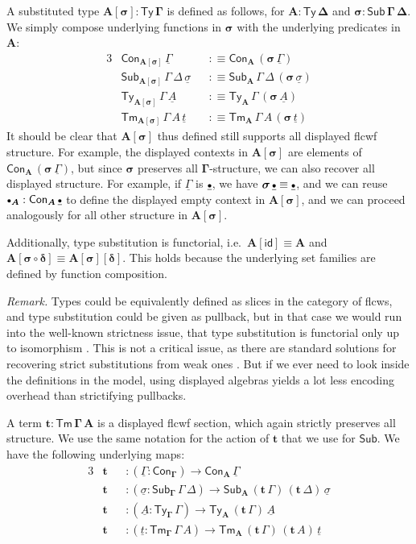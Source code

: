 \documentclass[12pt,a4paper,twoside,openany]{book}
\theoremstyle{remark}
\theoremstyle{definition}
\theoremstyle{theorem}
\newcommand{\bs}[1]{\boldsymbol{#1}}
\newcommand{\id}{\mathsf{id}}
\newcommand{\Con}{\mathsf{Con}}
\newcommand{\Sub}{\mathsf{Sub}}
\newcommand{\Tm}{\mathsf{Tm}}
\newcommand{\Ty}{\mathsf{Ty}}
\newcommand{\emptycon}{\scaleobj{.75}\bullet}
\newcommand{\bSub}{\bs{\Sub}}
\newcommand{\bGamma}{\bs{\Gamma}}
\newcommand{\bsigma}{\bs{\sigma}}
\newcommand{\bt}{\bs{t}}
\newcommand{\bA}{\bs{A}}
\newcommand{\ul}[1]{\underline{#1}}
\newcommand{\ulGamma}{\ul{\Gamma}}
\newcommand{\ulsigma}{\ul{\sigma}}
\newcommand{\ult}{\ul{t}}
\newcommand{\ulA}{\ul{A}}
\newcommand{\defn}{:\equiv}
\begin{document}
A substituted type $\bs{A[\sigma] : \Ty\,\Gamma}$ is defined as follows, for
$\bs{A : \Ty\,\Delta}$ and $\bs{\sigma : \Sub\,\Gamma\,\Delta}$. We simply compose
underlying functions in $\bsigma$ with the underlying predicates in $\bA$:
\begin{alignat*}{3}
  & \Con_{\bs{A[\sigma]}}\,\ulGamma && \defn \Con_{\bA}\,(\bsigma\,\ulGamma)\\
  & \Sub_{\bs{A[\sigma]}}\,\Gamma\,\Delta\,\ulsigma && \defn
    \Sub_{\bA}\,\Gamma\,\Delta\,(\bsigma\,\ulsigma)\\
  & \Ty_{\bs{A[\sigma]}}\,\Gamma\,\ulA && \defn
      \Ty_{\bA}\,\Gamma\,(\bsigma\,\ulA)\\
  & \Tm_{\bs{A[\sigma]}}\,\Gamma\,A\,\ult && \defn
      \Tm_{\bA}\,\Gamma\,A\,(\bsigma\,\ult)
\end{alignat*}
It should be clear that $\bs{A[\sigma]}$ thus defined still supports all
displayed flcwf structure. For example, the displayed contexts in
$\bs{A[\sigma]}$ are elements of $\Con_{\bA}\,(\bsigma\,\ulGamma)$, but since
$\bsigma$ preserves all $\bGamma$-structure, we can also recover all displayed
structure. For example, if $\ulGamma$ is $\ul{\emptycon}$, we have
$\bsigma\,\ul{\emptycon} \equiv \ul{\emptycon}$, and we can reuse
$\emptycon_{\bA} : \Con_{\bA}\,\ul{\emptycon}$ to define the displayed empty
context in $\bs{A[\sigma]}$, and we can proceed analogously for all other
structure in $\bs{A[\sigma]}$.

Additionally, type substitution is functorial, i.e.\ $\bs{A[\id]} \equiv \bA$
and $\bs{A[\sigma \circ \delta]} \equiv \bs{A[\sigma][\delta]}$. This holds
because the underlying set families are defined by function composition.

\emph{Remark.} Types could be equivalently defined as slices in the category of
flcws, and type substitution could be given as pullback, but in that case we
would run into the well-known strictness issue, that type substitution is
functorial only up to isomorphism \cite{TODO}. This is not a critical issue, as
there are standard solutions for recovering strict substitutions from weak ones
\cite{TODO}. But if we ever need to look inside the definitions in the model,
using displayed algebras yields a lot less encoding overhead than strictifying
pullbacks.

A term $\bs{t : \Tm\,\Gamma\,A}$ is a displayed flcwf section, which again
strictly preserves all structure. We use the same notation for the action of
$\bt$ that we use for $\bSub$. We have the following underlying maps:
\begin{alignat*}{3}
  & \bt &&: (\ulGamma : \Con_{\bGamma}) \to \Con_{\bA}\,\ulGamma \\
  & \bt &&: (\ulsigma : \Sub_{\bGamma}\,\Gamma\,\Delta) \to
             \Sub_{\bA}\,(\bt\,\Gamma)\,(\bt\,\Delta)\,\ulsigma\\
  & \bt &&: (\ulA : \Ty_{\bGamma}\,\Gamma) \to \Ty_{\bA}\,(\bt\,\Gamma)\,\ulA\\
  & \bt &&: (\ult : \Tm_{\bGamma}\,\Gamma\,A) \to \Tm_{\bA}\,(\bt\,\Gamma)\,(\bt\,A)\,\ult
\end{alignat*}
\end{document}
